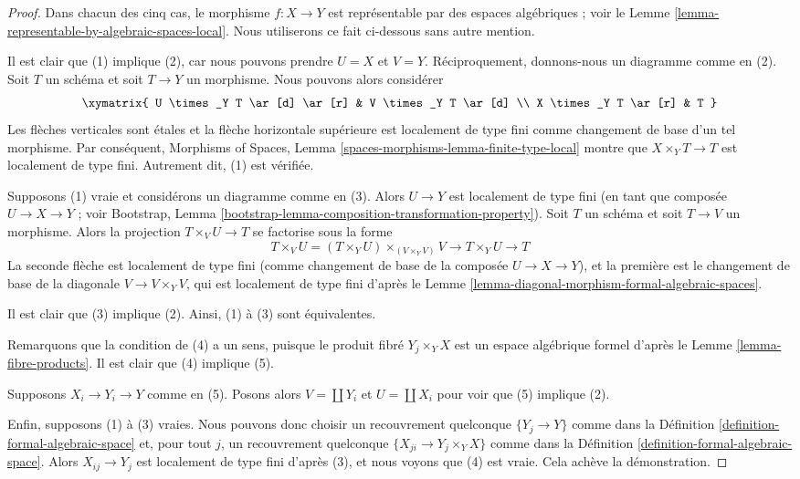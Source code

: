 \begin{proof}
Dans chacun des cinq cas, le morphisme $f : X \to Y$ est représentable
par des espaces algébriques ; voir le
Lemme \ref{lemma-representable-by-algebraic-spaces-local}.
Nous utiliserons ce fait ci-dessous sans autre mention.

\medskip\noindent
Il est clair que (1) implique (2), car nous pouvons prendre $U = X$ et $V = Y$.
Réciproquement, donnons-nous un diagramme comme en (2). Soit $T$ un schéma et
soit $T \to Y$ un morphisme. Nous pouvons alors considérer
$$
\xymatrix{
U \times_Y T \ar[d] \ar[r] & V \times_Y T \ar[d] \\
X \times_Y T \ar[r] & T
}
$$
Les flèches verticales sont étales et la flèche horizontale supérieure
est localement de type fini comme changement de base d'un tel morphisme.
Par conséquent, Morphisms of Spaces, Lemma
\ref{spaces-morphisms-lemma-finite-type-local} montre que
$X \times_Y T \to T$ est localement de type fini. Autrement dit,
(1) est vérifiée.

\medskip\noindent
Supposons (1) vraie et considérons un diagramme comme en (3).
Alors $U \to Y$ est localement de type fini
(en tant que composée $U \to X \to Y$ ; voir
Bootstrap, Lemma \ref{bootstrap-lemma-composition-transformation-property}).
Soit $T$ un schéma et soit $T \to V$ un morphisme.
Alors la projection $T \times_V U \to T$ se factorise sous la forme
$$
T \times_V U = (T \times_Y U) \times_{(V \times_Y V)} V
\to T \times_Y U \to T
$$
La seconde flèche est localement de type fini (comme changement de base
de la composée $U \to X \to Y$), et
la première est le changement de base de la diagonale $V \to V \times_Y V$,
qui est localement de type fini d'après le
Lemme \ref{lemma-diagonal-morphism-formal-algebraic-spaces}.

\medskip\noindent
Il est clair que (3) implique (2). Ainsi, (1) à (3) sont équivalentes.

\medskip\noindent
Remarquons que la condition de (4) a un sens, puisque le produit fibré
$Y_j \times_Y X$ est un espace algébrique formel d'après le
Lemme \ref{lemma-fibre-products}.
Il est clair que (4) implique (5).

\medskip\noindent
Supposons $X_i \to Y_i \to Y$ comme en (5). Posons alors
$V = \coprod Y_i$ et $U = \coprod X_i$ pour voir que
(5) implique (2).

\medskip\noindent
Enfin, supposons (1) à (3) vraies.
Nous pouvons donc choisir un recouvrement quelconque $\{Y_j \to Y\}$ comme dans la
Définition \ref{definition-formal-algebraic-space}
et, pour tout $j$, un recouvrement quelconque $\{X_{ji} \to Y_j \times_Y X\}$ comme dans la
Définition \ref{definition-formal-algebraic-space}.
Alors $X_{ij} \to Y_j$ est localement de type fini d'après (3),
et nous voyons que (4) est vraie. Cela achève la démonstration.
\end{proof}

